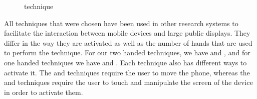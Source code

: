 \begin{figure}[H]
	\caption{\push \tilt technique}
	\label{fig:tiltTechnique}
\end{figure}

All techniques that were chosen have been used in other research systems to facilitate the interaction between mobile devices and large public displays.
They differ in the way they are activated as well as the number of hands that are used to perform the technique.
For our two handed techniques, we have \throw and \grab, and for one handed techniques we have \tilt and \swipe. 
Each technique also has different ways to activate it. 
The \throw and \tilt techniques require the user to move the phone, whereas the \swipe and \grab techniques require the user to touch and manipulate the screen of the device in order to activate them. 

